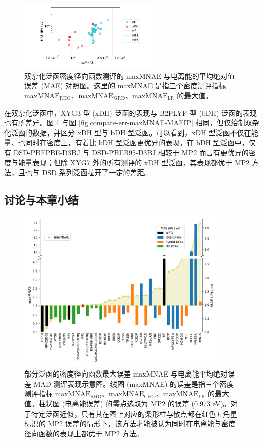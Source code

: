 \begin{figure}[t]
    \centering
    \caption{双杂化泛函密度径向函数测评的 $\text{maxMNAE}$ 与电离能的平均绝对值误差 (MAE) 对照图。这里的 maxMNAE 是指三个密度测评指标 $\text{maxMNAE}_\text{RHO}$、$\text{maxMNAE}_\text{GRD}$、$\text{maxMNAE}_\text{LR}$ 的最大值。}
    \label{fig.compare-err-maxMNAE-MAEIP-dh}
    \includegraphics[width=0.6\textwidth]{assets/compare-err-maxMNAE-MAEIP-dh.pdf}
\end{figure}

在双杂化泛函中，XYG3 型 (xDH) 泛函的表现与 B2PLYP 型 (bDH) 泛函的表现也有所差异。图 \ref{fig.compare-err-maxMNAE-MAEIP-dh} 与图 \ref{fig.compare-err-maxMNAE-MAEIP} 相同，但仅绘制双杂化泛函的数据，并区分 xDH 型与 bDH 型泛函。可以看到，xDH 型泛函不仅在能量、也同时在密度上，有着比 bDH 型泛函更优异的表现。在 bDH 型泛函中，仅有 DSD-PBEPBE-D3BJ 与 DSD-PBEB95-D3BJ 相较于 MP2 而言有更优异的密度与能量表现；但除 XYG7 外的所有测评的 xDH 型泛函，其表现都优于 MP2 方法，且也与 DSD 系列泛函拉开了一定的差距。

\subsection{讨论与本章小结}

\begin{figure}[t]
    \centering
    \caption{部分泛函的密度径向函数最大误差 maxMNAE 与电离能平均绝对误差 MAD 测评表现示意图。线图 (maxMNAE) 的误差是指三个密度测评指标 $\text{maxMNAE}_\text{RHO}$、$\text{maxMNAE}_\text{GRD}$、$\text{maxMNAE}_\text{LR}$ 的最大值。柱状图 (电离能误差) 的零点选取为 MP2 的误差 (0.973 eV)。对于特定泛函近似，只有其在图上对应的条形柱与散点都在红色五角星标识的 MP2 误差的情形下，该方法才能被认为同时在电离能与密度径向函数的表现上都优于 MP2 方法。}
    \label{fig.compare-err-relative}
    \includegraphics[width=0.9\textwidth]{assets/compare-err-relative.pdf}
\end{figure}

